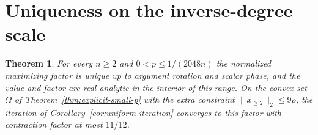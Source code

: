 \documentclass[11pt]{article}
\newtheorem{theorem}{Theorem}
\begin{document}
\section{Uniqueness on the inverse-degree scale}

\begin{theorem}\label{thm:linear-scale}
For every \(n\geq2\) and \(0<p\leq 1/(2048n)\) the normalized
maximizing factor is unique up to argument rotation and scalar
phase, and the value and factor are real analytic in the
interior of this range. On the convex set \(\Omega\) of
Theorem~\ref{thm:explicit-small-p} with the extra constraint
\(\|x_{\geq2}\|_2\leq9\rho\), the iteration of Corollary~\ref{cor:uniform-iteration} converges to this factor with contraction
factor at most \(11/12\).
\end{theorem}
\end{document}
